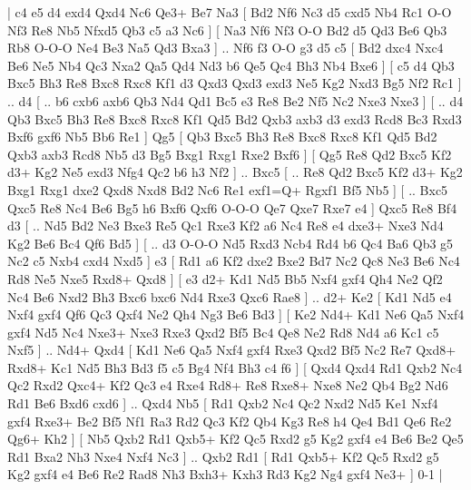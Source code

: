 \makegametitle 
|   c4   e5    d4   exd4    Qxd4   Nc6    Qe3+   Be7    Na3 [  Bd2 Nf6  Nc3 d5  cxd5 Nb4  Rc1 O-O  Nf3 Re8  Nb5 Nfxd5  Qb3 c5  a3 Nc6   ]  [  Na3 Nf6  Nf3 O-O  Bd2 d5  Qd3 Be6  Qb3 Rb8  O-O-O Ne4  Be3 Na5  Qd3 Bxa3   ] .. Nf6    f3   O-O    g3   d5    c5 [  Bd2 dxc4  Nxc4 Be6  Ne5 Nb4  Qc3 Nxa2  Qa5 Qd4  Nd3 b6  Qe5 Qc4  Bh3 Nb4  Bxe6   ]  [  c5 d4  Qb3 Bxc5  Bh3 Re8  Bxc8 Rxc8  Kf1 d3  Qxd3 Qxd3  exd3 Ne5  Kg2 Nxd3  Bg5 Nf2  Rc1   ] .. d4 [ .. b6  cxb6 axb6  Qb3 Nd4  Qd1 Bc5  e3 Re8  Be2 Nf5  Nc2 Nxe3  Nxe3   ]  [ .. d4  Qb3 Bxc5  Bh3 Re8  Bxc8 Rxc8  Kf1 Qd5  Bd2 Qxb3  axb3 d3  exd3 Rcd8  Bc3 Rxd3  Bxf6 gxf6  Nb5 Bb6  Re1   ]  Qg5 [  Qb3 Bxc5  Bh3 Re8  Bxc8 Rxc8  Kf1 Qd5  Bd2 Qxb3  axb3 Rcd8  Nb5 d3  Bg5 Bxg1  Rxg1 Rxe2  Bxf6   ]  [  Qg5 Re8  Qd2 Bxc5  Kf2 d3+  Kg2 Ne5  exd3 Nfg4  Qc2 b6  h3 Nf2   ] .. Bxc5 [ .. Re8  Qd2 Bxc5  Kf2 d3+  Kg2 Bxg1  Rxg1 dxe2  Qxd8 Nxd8  Bd2 Nc6  Re1 exf1=Q+  Rgxf1 Bf5  Nb5   ]  [ .. Bxc5  Qxc5 Re8  Nc4 Be6  Bg5 h6  Bxf6 Qxf6  O-O-O Qe7  Qxe7 Rxe7  e4   ]  Qxc5   Re8    Bf4   d3 [ .. Nd5  Bd2 Ne3  Bxe3 Re5  Qc1 Rxe3  Kf2 a6  Nc4 Re8  e4 dxe3+  Nxe3 Nd4  Kg2 Be6  Bc4 Qf6  Bd5   ]  [ .. d3  O-O-O Nd5  Rxd3 Ncb4  Rd4 b6  Qc4 Ba6  Qb3 g5  Nc2 c5  Nxb4 cxd4  Nxd5   ]  e3 [  Rd1 a6  Kf2 dxe2  Bxe2 Bd7  Nc2 Qc8  Ne3 Be6  Nc4 Rd8  Ne5 Nxe5  Rxd8+ Qxd8   ]  [  e3 d2+  Kd1 Nd5  Bb5 Nxf4  gxf4 Qh4  Ne2 Qf2  Nc4 Be6  Nxd2 Bh3  Bxc6 bxc6  Nd4 Rxe3  Qxc6 Rae8   ] .. d2+    Ke2 [  Kd1 Nd5  e4 Nxf4  gxf4 Qf6  Qc3 Qxf4  Ne2 Qh4  Ng3 Be6  Bd3   ]  [  Ke2 Nd4+  Kd1 Ne6  Qa5 Nxf4  gxf4 Nd5  Nc4 Nxe3+  Nxe3 Rxe3  Qxd2 Bf5  Bc4 Qe8  Ne2 Rd8  Nd4 a6  Kc1 c5  Nxf5   ] .. Nd4+    Qxd4 [  Kd1 Ne6  Qa5 Nxf4  gxf4 Rxe3  Qxd2 Bf5  Nc2 Re7  Qxd8+ Rxd8+  Kc1 Nd5  Bh3 Bd3  f5 c5  Bg4 Nf4  Bh3 c4  f6   ]  [  Qxd4 Qxd4  Rd1 Qxb2  Nc4 Qc2  Rxd2 Qxc4+  Kf2 Qc3  e4 Rxe4  Rd8+ Re8  Rxe8+ Nxe8  Ne2 Qb4  Bg2 Nd6  Rd1 Be6  Bxd6 cxd6   ] .. Qxd4    Nb5 [  Rd1 Qxb2  Nc4 Qc2  Nxd2 Nd5  Ke1 Nxf4  gxf4 Rxe3+  Be2 Bf5  Nf1 Ra3  Rd2 Qc3  Kf2 Qb4  Kg3 Re8  h4 Qe4  Bd1 Qe6  Re2 Qg6+  Kh2   ]  [  Nb5 Qxb2  Rd1 Qxb5+  Kf2 Qc5  Rxd2 g5  Kg2 gxf4  e4 Be6  Be2 Qe5  Rd1 Bxa2  Nh3 Nxe4  Nxf4 Nc3   ] .. Qxb2    Rd1    [  Rd1 Qxb5+  Kf2 Qc5  Rxd2 g5  Kg2 gxf4  e4 Be6  Re2 Rad8  Nh3 Bxh3+  Kxh3 Rd3  Kg2 Ng4  gxf4 Ne3+   ] 0-1  |
